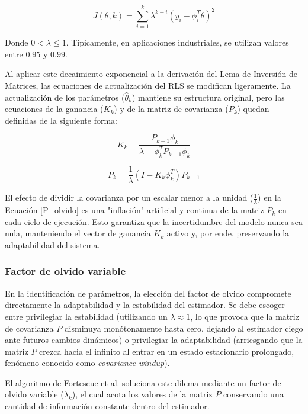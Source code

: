 \[
  J(\theta, k) = \sum_{i=1}^{k} \lambda^{k-i} (y_i - \phi_i^T \theta)^2
\]

Donde $0 < \lambda \le 1$. Típicamente, en aplicaciones industriales, se utilizan valores entre $0.95$ y $0.99$. 

Al aplicar este decaimiento exponencial a la derivación del Lema de Inversión de Matrices, las ecuaciones de actualización del RLS se modifican ligeramente. La actualización de los parámetros ($\hat{\theta}_k$) mantiene su estructura original, pero las ecuaciones de la ganancia ($K_k$) y de la matriz de covarianza ($P_k$) quedan definidas de la siguiente forma:

\begin{equation}
  K_k = \frac{P_{k-1}\phi_k}{\lambda + \phi_k^T P_{k-1} \phi_k}
  \label{K_olvido}
\end{equation}

\begin{equation}
  P_k = \frac{1}{\lambda} (I - K_k \phi_k^T) P_{k-1}
  \label{P_olvido}
\end{equation}

El efecto de dividir la covarianza por un escalar menor a la unidad ($\frac{1}{\lambda}$) en la Ecuación \ref{P_olvido} es una "inflación" artificial y continua de la matriz $P_k$ en cada ciclo de ejecución. Esto garantiza que la incertidumbre del modelo nunca sea nula, manteniendo el vector de ganancia $K_k$ activo y, por ende, preservando la adaptabilidad del sistema.

\subsubsection{Factor de olvido variable}

En la identificación de parámetros, la elección del factor de olvido compromete directamente la adaptabilidad y la estabilidad del estimador. Se debe escoger entre privilegiar la estabilidad (utilizando un $\lambda \approx 1$, lo que provoca que la matriz de covarianza $P$ disminuya monótonamente hasta cero, dejando al estimador ciego ante futuros cambios dinámicos) o privilegiar la adaptabilidad (arriesgando que la matriz $P$ crezca hacia el infinito al entrar en un estado estacionario prolongado, fenómeno conocido como \textit{covariance windup}).

El algoritmo de Fortescue et al. \cite{fortescue1981implementation} soluciona este dilema mediante un factor de olvido variable ($\lambda_k$), el cual acota los valores de la matriz $P$ conservando una cantidad de información constante dentro del estimador. 


